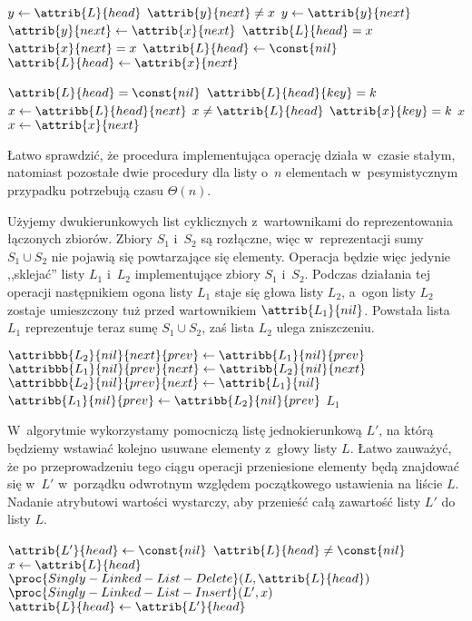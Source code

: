\begin{codebox}
\li	$y\gets\attrib{L}{head}$
\li	\While $\attrib{y}{next}\ne x$
\li		\Do $y\gets\attrib{y}{next}$
		\End
\li	$\attrib{y}{next}\gets\attrib{x}{next}$
\li	\If $\attrib{L}{head}=x$
\li		\Then \If $\attrib{x}{next}=x$
\li				\Then $\attrib{L}{head}\gets\const{nil}$
\li				\Else $\attrib{L}{head}\gets\attrib{x}{next}$
				\End
		\End
\end{codebox}

\begin{codebox}
\li	\If $\attrib{L}{head}=\const{nil}$
\li		\Then \Return {}
		\End
\li	\If $\attribb{L}{head}{key}=k$
\li		\Then \Return {}
		\End
\li	$x\gets\attribb{L}{head}{next}$
\li	\While $x\ne\attrib{L}{head}$
\li		\Do \If $\attrib{x}{key}=k$
\li				\Then \Return $x$
				\End
\li			$x\gets\attrib{x}{next}$
		\End
\li	\Return {}
\end{codebox}

Łatwo sprawdzić, że procedura implementująca operację  działa w~czasie stałym, natomiast pozostałe dwie procedury dla listy o~$n$ elementach w~pesymistycznym przypadku potrzebują czasu $\Theta(n)$.

\exercise %
Użyjemy dwukierunkowych list cyklicznych z~wartownikami do reprezentowania łączonych zbiorów.
Zbiory $S_1$ i~$S_2$ są rozłączne, więc w~reprezentacji sumy $S_1\cup S_2$ nie pojawią się powtarzające się elementy.
Operacja  będzie więc jedynie ,,sklejać'' listy $L_1$ i~$L_2$ implementujące zbiory $S_1$ i~$S_2$.
Podczas działania tej operacji następnikiem ogona listy $L_1$ staje się głowa listy $L_2$, a~ogon listy $L_2$ zostaje umieszczony tuż przed wartownikiem $\attrib{L_1}{nil}$.
Powstała lista $L_1$ reprezentuje teraz sumę $S_1\cup S_2$, zaś lista $L_2$ ulega zniszczeniu.
\begin{codebox}
\li	$\attribbb{L_2}{nil}{next}{prev}\gets\attribb{L_1}{nil}{prev}$
\li	$\attribbb{L_1}{nil}{prev}{next}\gets\attribb{L_2}{nil}{next}$
\li	$\attribbb{L_2}{nil}{prev}{next}\gets\attrib{L_1}{nil}$
\li	$\attribb{L_1}{nil}{prev}\gets\attribb{L_2}{nil}{prev}$
\li	\Return $L_1$
\end{codebox}

\exercise %
W~algorytmie wykorzystamy pomocniczą listę jednokierunkową $L'$, na którą będziemy wstawiać kolejno usuwane elementy z~głowy listy $L$.
Łatwo zauważyć, że po przeprowadzeniu tego ciągu operacji przeniesione elementy będą znajdować się w~$L'$ w~porządku odwrotnym względem początkowego ustawienia na liście $L$.
Nadanie atrybutowi  wartości  wystarczy, aby przenieść całą zawartość listy $L'$ do listy $L$.
\begin{codebox}
\li	$\attrib{L'}{head}\gets\const{nil}$
\li	\While $\attrib{L}{head}\ne\const{nil}$
\li		\Do $x\gets\attrib{L}{head}$
\li			$\proc{Singly-Linked-List-Delete}(L,\attrib{L}{head})$
\li			$\proc{Singly-Linked-List-Insert}(L',x)$
		\End
\li	$\attrib{L}{head}\gets\attrib{L'}{head}$
\end{codebox}


